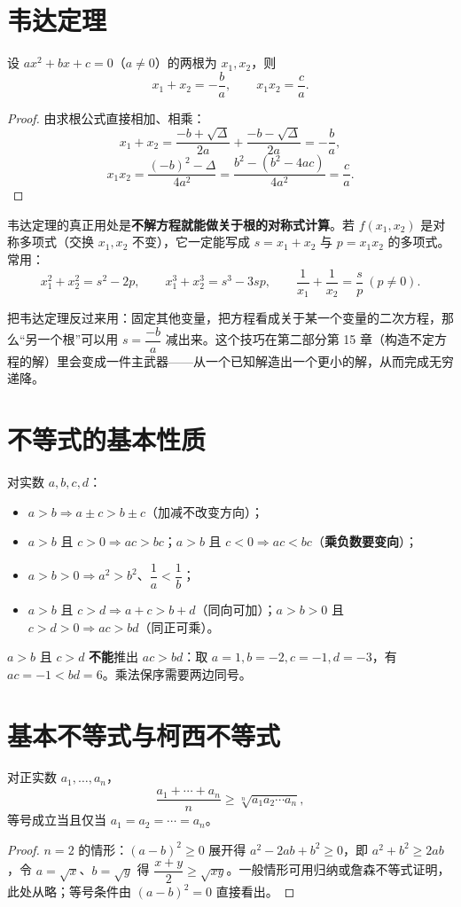 \section{韦达定理}
\begin{theorem}[韦达定理]
设 $ax^2+bx+c=0$（$a\ne0$）的两根为 $x_1,x_2$，则
\[
x_1+x_2=-\frac ba,\qquad x_1x_2=\frac ca.
\]
\end{theorem}
\begin{proof}
由求根公式直接相加、相乘：
\[
x_1+x_2=\frac{-b+\sqrt\Delta}{2a}+\frac{-b-\sqrt\Delta}{2a}=-\frac ba,
\]
\[
x_1x_2=\frac{(-b)^2-\Delta}{4a^2}=\frac{b^2-(b^2-4ac)}{4a^2}=\frac ca.
\]
\end{proof}

韦达定理的真正用处是\textbf{不解方程就能做关于根的对称式计算}。若 $f(x_1,x_2)$ 是对称多项式（交换 $x_1,x_2$ 不变），它一定能写成 $s=x_1+x_2$ 与 $p=x_1x_2$ 的多项式。常用：
\[
x_1^2+x_2^2=s^2-2p,\qquad
x_1^3+x_2^3=s^3-3sp,\qquad
\frac1{x_1}+\frac1{x_2}=\frac{s}{p}\ (p\ne0).
\]

\begin{tip}[韦达跳跃]
把韦达定理反过来用：固定其他变量，把方程看成关于某一个变量的二次方程，那么“另一个根”可以用 $s=\dfrac{-b}{a}$ 减出来。这个技巧在第二部分第 15 章（构造不定方程的解）里会变成一件主武器——从一个已知解造出一个更小的解，从而完成无穷递降。
\end{tip}

\section{不等式的基本性质}
对实数 $a,b,c,d$：
\begin{itemize}
\item $a>b\Rightarrow a\pm c>b\pm c$（加减不改变方向）；
\item $a>b$ 且 $c>0\Rightarrow ac>bc$；$a>b$ 且 $c<0\Rightarrow ac<bc$（\textbf{乘负数要变向}）；
\item $a>b>0\Rightarrow a^2>b^2$、$\dfrac1a<\dfrac1b$；
\item $a>b$ 且 $c>d\Rightarrow a+c>b+d$（同向可加）；$a>b>0$ 且 $c>d>0\Rightarrow ac>bd$（同正可乘）。
\end{itemize}

\begin{pitfall}
$a>b$ 且 $c>d$ \textbf{不能}推出 $ac>bd$：取 $a=1,b=-2,c=-1,d=-3$，有 $ac=-1<bd=6$。乘法保序需要两边同号。
\end{pitfall}

\section{基本不等式与柯西不等式}
\begin{theorem}[均值不等式（AM--GM）]
对正实数 $a_1,\ldots,a_n$，
\[
\frac{a_1+\cdots+a_n}{n}\ge\sqrt[n]{a_1a_2\cdots a_n},
\]
等号成立当且仅当 $a_1=a_2=\cdots=a_n$。
\end{theorem}
\begin{proof}
$n=2$ 的情形：$(a-b)^2\ge0$ 展开得 $a^2-2ab+b^2\ge0$，即 $a^2+b^2\ge2ab$，令 $a=\sqrt x$、$b=\sqrt y$ 得 $\dfrac{x+y}{2}\ge\sqrt{xy}$。一般情形可用归纳或詹森不等式证明，此处从略；等号条件由 $(a-b)^2=0$ 直接看出。
\end{proof}

